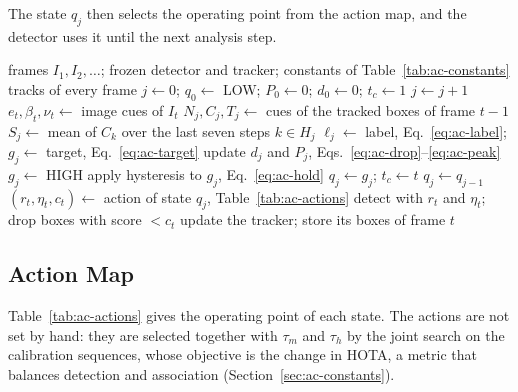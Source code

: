The state $q_j$ then selects the operating point from the action map, and the detector uses it until the next analysis step.

\begin{algorithm}[tbp]
\caption{AC-MOT controller for one video.}\label{alg:ac-controller}
\begin{algorithmic}[1]
\Require frames $I_1, I_2, \dots$; frozen detector and tracker; constants of Table~\ref{tab:ac-constants}
\Ensure tracks of every frame
\State $j\gets0$; $q_0\gets$ LOW; $P_0\gets0$; $d_0\gets0$; $t_c\gets1$
   
    \State $j\gets j+1$
    \State $e_t,\beta_t,\nu_t\gets$ image cues of $I_t$ 
    \State $N_j,C_j,T_j\gets$ cues of the tracked boxes of frame $t-1$ 
    \State $S_j\gets$ mean of $C_k$ over the last seven steps $k\in H_j$ 
    \State $\ell_j\gets$ label, Eq.~\eqref{eq:ac-label}; $g_j\gets$ target, Eq.~\eqref{eq:ac-target} 
    \State update $d_j$ and $P_j$, Eqs.~\eqref{eq:ac-drop}--\eqref{eq:ac-peak}
     $g_j\gets$ HIGH 
    \EndIf
    \State apply hysteresis to $g_j$, Eq.~\eqref{eq:ac-hold} 
     
      \State $q_j\gets g_j$; $t_c\gets t$
    \Else
      \State $q_j\gets q_{j-1}$
    \EndIf
  \EndIf
  \State $(r_t,\eta_t,c_t)\gets$ action of state $q_j$, Table~\ref{tab:ac-actions} 
  \State detect with $r_t$ and $\eta_t$; drop boxes with score $<c_t$
  \State update the tracker; store its boxes of frame $t$ 
\EndFor
\end{algorithmic}
\end{algorithm}

\subsection{Action Map}\label{sec:ac-actions}
Table~\ref{tab:ac-actions} gives the operating point of each state. The actions are not set by hand: they are selected together with $\tau_m$ and $\tau_h$ by the joint search on the calibration sequences, whose objective is the change in HOTA, a metric that balances detection and association (Section~\ref{sec:ac-constants}).


